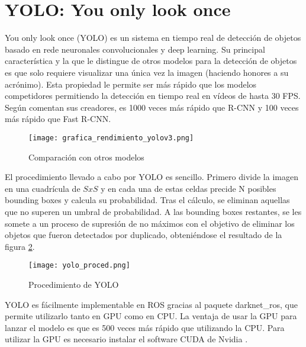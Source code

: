 \section{YOLO: You only look once}

You only look once (YOLO) es un sistema en tiempo real de detección de objetos basado en rede neuronales convolucionales y deep learning. Su principal característica y la que le distingue de otros modelos para la detección de objetos es que solo requiere visualizar una única vez la imagen (haciendo honores a su acrónimo). Esta propiedad le permite ser más rápido que los modelos competidores permitiendo la detección en tiempo real en vídeos de hasta 30 FPS. Según comentan sus creadores, es 1000 veces más rápido que R-CNN y 100 veces más rápido que Fast R-CNN. \\

\begin{figure}[h]
	\begin{center} 
		\texttt{[image: grafica\_rendimiento\_yolov3.png]}
	\end{center}
	\caption{Comparación con otros modelos}
	\label{fig:rend}
\end{figure}


El procedimiento llevado a cabo por YOLO es sencillo. Primero divide la imagen en una cuadrícula de $SxS$ y en cada una de estas celdas precide N posibles bounding boxes y calcula su probabilidad. Tras el cálculo, se eliminan aquellas que no superen un umbral de probabilidad. A las bounding boxes restantes, se les somete a un proceso de supresión de no máximos con el objetivo de eliminar los objetos que fueron detectados por duplicado, obteniéndose el resultado de la figura \ref{fig:proced}.\\

\begin{figure}[h]
	\begin{center} 
		\texttt{[image: yolo\_proced.png]}
	\end{center}
	\caption{Procedimiento de YOLO}
	\label{fig:proced}
\end{figure}

YOLO es fácilmente implementable en ROS gracias al paquete darknet\_ros, que permite utilizarlo tanto en GPU como en CPU. La ventaja de usar la GPU para lanzar el modelo es que es 500 veces más rápido que utilizando la CPU. Para utilizar la GPU es necesario instalar el software CUDA de Nvidia \cite{yolo}.\\

